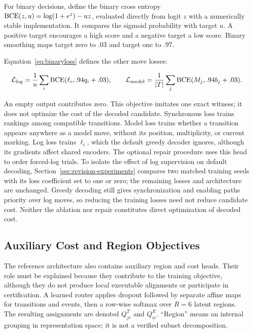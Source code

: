 For binary decisions, define the binary cross entropy $\operatorname{BCE}(z,u)=\log(1+e^z)-uz$, evaluated directly from logit $z$ with a numerically stable implementation. It compares the sigmoid probability with target $u$. A positive target encourages a high score and a negative target a low score. Binary smoothing maps target zero to $.03$ and target one to $.97$. \begin{revised}Equation~\eqref{eq:binaryloss} defines the other move losses:\end{revised}
\begin{equation}
 \mathcal L_{\mathrm{log}}=\frac1n\sum_i\operatorname{BCE}(\ell_i,.94q_i+.03),\qquad
 \mathcal L_{\mathrm{model}}=\frac1{|T|}\sum_j\operatorname{BCE}(M_j,.94b_j+.03).
 \label{eq:binaryloss}
\end{equation}
\begin{revised}An empty output contributes zero. This objective imitates one exact witness; it does not optimize the cost of the decoded candidate. Synchronous loss trains rankings among compatible transitions. Model loss trains whether a transition appears anywhere as a model move, without its position, multiplicity, or current marking. Log loss trains $\ell_i$, which the default greedy decoder ignores, although its gradients affect shared encoders. The optional repair procedure uses this head to order forced-log trials. To isolate the effect of log supervision on default decoding, Section~\ref{sec:revision-experiments} compares two matched training seeds with its loss coefficient set to one or zero; the remaining losses and architecture are unchanged. Greedy decoding still gives synchronization and enabling paths priority over log moves, so reducing the training losses need not reduce candidate cost. Neither the ablation nor repair constitutes direct optimization of decoded cost.\end{revised}

\subsection{Auxiliary Cost and Region Objectives}
\label{sec:auxiliary}

The reference architecture also contains auxiliary region and cost heads. Their role must be explained because they contribute to the training objective, although they do not produce local executable alignments or participate in certification. A learned router applies dropout followed by separate affine maps for transitions and events, then a row-wise softmax over $R=6$ latent regions. The resulting assignments are denoted $Q^T_{jr}$ and $Q^E_{ir}$. ``Region'' means an internal grouping in representation space; it is not a verified subnet decomposition.

